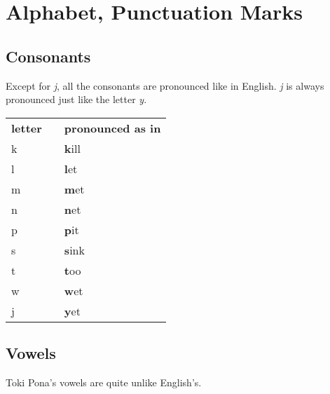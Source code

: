 \label{'pronunciation_alphabet'}
\section{Alphabet, Punctuation Marks}
%
\subsection*{Consonants}
%
Except for \textit{j}, all the consonants are pronounced like in English.
\textit{j} is always pronounced just like the letter \textit{y}.

\begin{supertabular}{p{2cm}|ll}
    \textbf{letter} &  & \textbf{pronounced as in} \\ %
    k               &  & \textbf{k}ill             \\ %
    l               &  & \textbf{l}et              \\ %
    m               &  & \textbf{m}et              \\ %
    n               &  & \textbf{n}et              \\ %
    p               &  & \textbf{p}it              \\ %
    s               &  & \textbf{s}ink             \\ %
    t               &  & \textbf{t}oo              \\ %
    w               &  & \textbf{w}et              \\ %
    j               &  & \textbf{y}et              \\ %
\end{supertabular}

\subsection*{Vowels}
%
Toki Pona's vowels are quite unlike English's.

